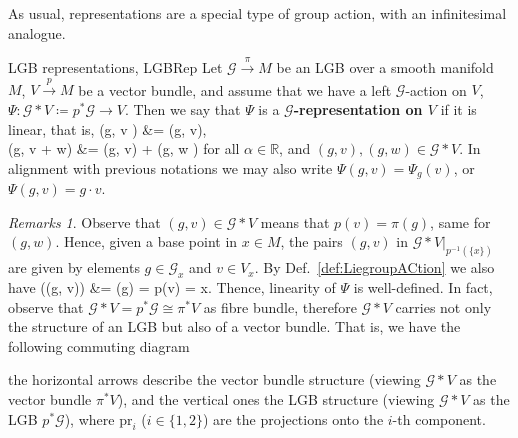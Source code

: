 \documentclass[a4paper,oneside,11pt,bibliography=totoc]{scrartcl}
\def\bas#1\eas{\begin{align*}#1\end{align*}}
\theoremstyle{plain}
\theoremstyle{remark}
\newtheorem{remark}[theorem]{Remarks}
\theoremstyle{definition}
\begin{document}
As usual, representations are a special type of group action, with an infinitesimal analogue. 

\begin{definitions}{LGB representations, \newline\cite[\S 1.7, special situation of the remark before Def.\ 1.7.1, page 43]{mackenzieGeneralTheory}}{LGBRep}
Let $\mathcal{G} \stackrel{\pi}{\to} M$ be an LGB over a smooth manifold $M$, $V \stackrel{p}{\to} M$ be a vector bundle, and assume that we have a left $\mathcal{G}$-action on $V$, $\Psi: \mathcal{G}*V \coloneqq p^*\mathcal{G}\to V$. Then we say that $\Psi$ is a \textbf{$\mathcal{G}$-representation on $V$} if it is linear, that is,
\bas
\Psi(g, \alpha v )
&=
\alpha \Psi(g, v),\\
\Psi(g, v + w)
&=
\Psi(g, v) + \Psi(g, w )
\eas
for all $\alpha \in \mathbb{R}$, and $(g, v), (g, w) \in \mathcal{G}*V$. In alignment with previous notations we may also write $\Psi(g, v) = \Psi_g(v)$, or $\Psi(g, v) = g \cdot v$.
\end{definitions}

\begin{remark}
\leavevmode\newline
Observe that $(g, v) \in \mathcal{G}*V$ means that $p(v) = \pi(g)$, same for $(g, w)$. Hence, given a base point in $x\in M$, the pairs $(g, v)$ in $\mathcal{G}*V|_{p^{-1}(\{x\})}$ are given by elements $g \in \mathcal{G}_x$ and $v \in V_x$. By Def.\ \ref{def:LiegroupACtion} we also have 
\bas
p\bigl(\Psi(g, v)\bigr)
&=
\pi(g) = p(v) = x.
\eas
Thence, linearity of $\Psi$ is well-defined. In fact, observe that $\mathcal{G} * V = p^*\mathcal{G} \cong \pi^*V$ as fibre bundle, therefore $\mathcal{G} * V$ carries not only the structure of an LGB but also of a vector bundle. That is, we have the following commuting diagram
\begin{center}
\end{center}
the horizontal arrows describe the vector bundle structure (viewing $\mathcal{G} * V$ as the vector bundle $\pi^*V$), and the vertical ones the LGB structure (viewing $\mathcal{G} * V$ as the LGB $p^*\mathcal{G}$), where $\mathrm{pr}_i$ ($i \in \{1,2\}$) are the projections onto the $i$-th component.
\end{remark}
\end{document}
